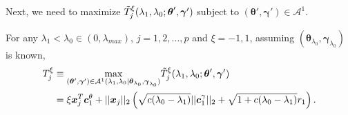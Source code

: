 Next, we need to maximize $\Tilde{T}^\xi_j(\lambda_1,\lambda_0;\boldsymbol\theta',\boldsymbol\gamma')$ subject to $(\boldsymbol\theta',\boldsymbol\gamma')\in\mathcal{A}^1$.

\begin{theorem}
    \label{thm:2.1.alt}
    For any $\lambda_1<\lambda_{0}\in (0,\lambda_{max})$, $j=1,2,...,p$ and $\xi=-1,1$, assuming $(\boldsymbol\theta_{\lambda_0},\boldsymbol\gamma_{\lambda_0})$ is known,
    \begin{gather}
        \begin{aligned}
            T^\xi_j&\equiv\underset{(\boldsymbol\theta',\boldsymbol\gamma')\in\mathcal{A}^1(\lambda_1,\lambda_0|\boldsymbol\theta_{\lambda_0},\boldsymbol\gamma_{\lambda_0})}{\mathrm{max}}\Tilde{T}^\xi_j(\lambda_1,\lambda_0;\boldsymbol\theta',\boldsymbol\gamma')\\
            &=\xi \boldsymbol x_j^T \boldsymbol c_1^\theta+||\boldsymbol x_j||_2\left(\sqrt{c(\lambda_0-\lambda_1)}||\boldsymbol c_1^\gamma||_2+\sqrt{1+c(\lambda_0-\lambda_1)}r_1\right).
        \end{aligned}
    \end{gather}
\end{theorem}